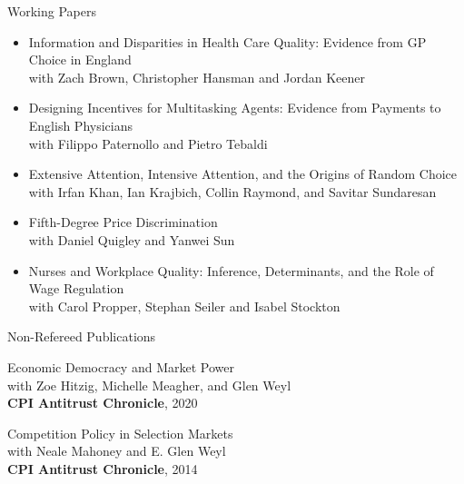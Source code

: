\documentclass{resume}
\begin{document}
\begin{rSection}{Working Papers}

\begin{itemize}
	\item Information and Disparities in Health Care Quality: Evidence from GP Choice in England \\ 
	with Zach Brown, Christopher Hansman and Jordan Keener

	\item Designing Incentives for Multitasking Agents: Evidence from Payments to English Physicians\\ 
	with Filippo Paternollo and Pietro Tebaldi
	
	\item Extensive Attention, Intensive Attention, and the Origins of Random Choice\\ 
	with Irfan Khan, Ian Krajbich, Collin Raymond, and Savitar Sundaresan
	
	\item Fifth-Degree Price Discrimination \\ 
	with Daniel Quigley and Yanwei Sun
	
	\item Nurses and Workplace Quality: Inference, Determinants, and the Role of Wage Regulation \\ 
	with Carol Propper, Stephan Seiler and Isabel Stockton


\end{itemize}




\end{rSection}











\begin{rSection}{Non-Refereed Publications}
	
\begin{etaremune}

\item Economic Democracy and Market Power\\
with Zoe Hitzig, Michelle Meagher, and Glen Weyl \\ 
\textbf{CPI Antitrust Chronicle}, 2020


\item Competition Policy in Selection Markets\\ 
with Neale Mahoney and E. Glen Weyl \\ 
\textbf{CPI Antitrust Chronicle}, 2014
	
		
\end{etaremune}


\end{rSection}
\end{document}
